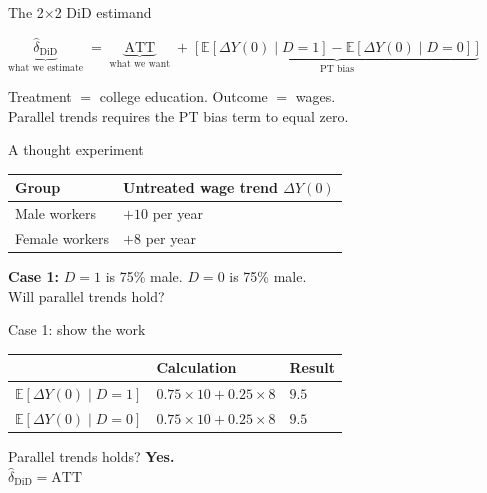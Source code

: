 \documentclass[aspectratio=169,11pt]{beamer}
\begin{document}
\begin{frame}{The 2$\times$2 DiD estimand}
\vspace{0.8em}
\begin{center}
\large
$\underbrace{\widehat{\delta}_{\text{DiD}}}_{\text{what we estimate}}
 \;=\;
 \underbrace{\text{ATT}}_{\text{what we want}}
 \;+\;
 \underbrace{\bigl[\,\mathbb{E}[\Delta Y(0)\mid D{=}1]
              - \mathbb{E}[\Delta Y(0)\mid D{=}0]\,\bigr]}_{\text{PT bias}}$
\end{center}
\vspace{0.8em}
\begin{center}\color{warmgray}\small
Treatment $=$ college education. \quad Outcome $=$ wages.\\
Parallel trends requires the PT bias term to equal zero.
\end{center}
\end{frame}

\begin{frame}{A thought experiment}
\vspace{0.5em}
\begin{center}
\begin{tabular}{@{}ll@{}}
\toprule
\textbf{Group} & \textbf{Untreated wage trend $\Delta Y(0)$} \\
\midrule
Male workers   & $+10$ per year \\
Female workers & $+8$\phantom{0} per year \\
\bottomrule
\end{tabular}
\end{center}
\vspace{0.8em}
\begin{center}
\textbf{Case 1:} $D{=}1$ is 75\% male. \quad $D{=}0$ is 75\% male.\\[0.4em]
\color{warmgray}\small Will parallel trends hold?
\end{center}
\end{frame}

\begin{frame}{Case 1: show the work}
\vspace{0.6em}
\begin{center}
\begin{tabular}{@{}lll@{}}
\toprule
& \textbf{Calculation} & \textbf{Result} \\
\midrule
$\mathbb{E}[\Delta Y(0)\mid D{=}1]$ & $0.75\times10 + 0.25\times8$ & $9.5$ \\[0.3em]
$\mathbb{E}[\Delta Y(0)\mid D{=}0]$ & $0.75\times10 + 0.25\times8$ & $9.5$ \\
\bottomrule
\end{tabular}
\end{center}
\vspace{0.8em}
\begin{center}
Parallel trends holds? \quad \textcolor{forest}{\textbf{Yes.}}\\[0.3em]
\color{warmgray}\small $\widehat{\delta}_{\text{DiD}} = \text{ATT}$ \;\checkmark
\end{center}
\end{frame}
\end{document}
